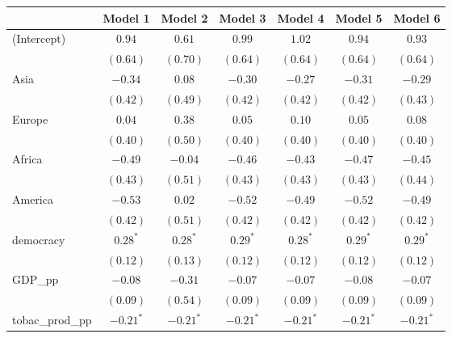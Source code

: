 
\begin{table}[!h]
\begin{center}
\begin{tabular}{l c c c c c c }
\toprule
 & Model 1 & Model 2 & Model 3 & Model 4 & Model 5 & Model 6 \\
\midrule
(Intercept)             & $0.94$       & $0.61$       & $0.99$       & $1.02$       & $0.94$       & $0.93$       \\
                        & $(0.64)$     & $(0.70)$     & $(0.64)$     & $(0.64)$     & $(0.64)$     & $(0.64)$     \\
Asia                    & $-0.34$      & $0.08$       & $-0.30$      & $-0.27$      & $-0.31$      & $-0.29$      \\
                        & $(0.42)$     & $(0.49)$     & $(0.42)$     & $(0.42)$     & $(0.42)$     & $(0.43)$     \\
Europe                  & $0.04$       & $0.38$       & $0.05$       & $0.10$       & $0.05$       & $0.08$       \\
                        & $(0.40)$     & $(0.50)$     & $(0.40)$     & $(0.40)$     & $(0.40)$     & $(0.40)$     \\
Africa                  & $-0.49$      & $-0.04$      & $-0.46$      & $-0.43$      & $-0.47$      & $-0.45$      \\
                        & $(0.43)$     & $(0.51)$     & $(0.43)$     & $(0.43)$     & $(0.43)$     & $(0.44)$     \\
America                 & $-0.53$      & $0.02$       & $-0.52$      & $-0.49$      & $-0.52$      & $-0.49$      \\
                        & $(0.42)$     & $(0.51)$     & $(0.42)$     & $(0.42)$     & $(0.42)$     & $(0.42)$     \\
democracy               & $0.28^{*}$   & $0.28^{*}$   & $0.29^{*}$   & $0.28^{*}$   & $0.29^{*}$   & $0.29^{*}$   \\
                        & $(0.12)$     & $(0.13)$     & $(0.12)$     & $(0.12)$     & $(0.12)$     & $(0.12)$     \\
GDP\_pp                 & $-0.08$      & $-0.31$      & $-0.07$      & $-0.07$      & $-0.08$      & $-0.07$      \\
                        & $(0.09)$     & $(0.54)$     & $(0.09)$     & $(0.09)$     & $(0.09)$     & $(0.09)$     \\
tobac\_prod\_pp         & $-0.21^{*}$  & $-0.21^{*}$  & $-0.21^{*}$  & $-0.21^{*}$  & $-0.21^{*}$  & $-0.21^{*}$  \\

\end{tabular}
\end{center}
\end{table}
